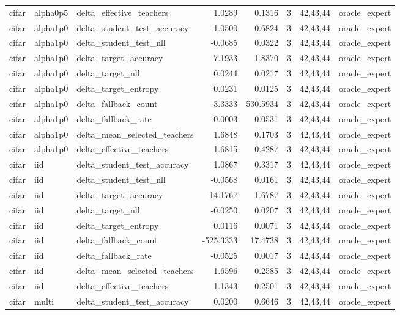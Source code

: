 \begin{tabular}{lllrrrll}
cifar & alpha0p5 & delta\_effective\_teachers & 1.0289 & 0.1316 & 3 & 42,43,44 & oracle\_expert \\
cifar & alpha1p0 & delta\_student\_test\_accuracy & 1.0500 & 0.6824 & 3 & 42,43,44 & oracle\_expert \\
cifar & alpha1p0 & delta\_student\_test\_nll & -0.0685 & 0.0322 & 3 & 42,43,44 & oracle\_expert \\
cifar & alpha1p0 & delta\_target\_accuracy & 7.1933 & 1.8370 & 3 & 42,43,44 & oracle\_expert \\
cifar & alpha1p0 & delta\_target\_nll & 0.0244 & 0.0217 & 3 & 42,43,44 & oracle\_expert \\
cifar & alpha1p0 & delta\_target\_entropy & 0.0231 & 0.0125 & 3 & 42,43,44 & oracle\_expert \\
cifar & alpha1p0 & delta\_fallback\_count & -3.3333 & 530.5934 & 3 & 42,43,44 & oracle\_expert \\
cifar & alpha1p0 & delta\_fallback\_rate & -0.0003 & 0.0531 & 3 & 42,43,44 & oracle\_expert \\
cifar & alpha1p0 & delta\_mean\_selected\_teachers & 1.6848 & 0.1703 & 3 & 42,43,44 & oracle\_expert \\
cifar & alpha1p0 & delta\_effective\_teachers & 1.6815 & 0.4287 & 3 & 42,43,44 & oracle\_expert \\
cifar & iid & delta\_student\_test\_accuracy & 1.0867 & 0.3317 & 3 & 42,43,44 & oracle\_expert \\
cifar & iid & delta\_student\_test\_nll & -0.0568 & 0.0161 & 3 & 42,43,44 & oracle\_expert \\
cifar & iid & delta\_target\_accuracy & 14.1767 & 1.6787 & 3 & 42,43,44 & oracle\_expert \\
cifar & iid & delta\_target\_nll & -0.0250 & 0.0207 & 3 & 42,43,44 & oracle\_expert \\
cifar & iid & delta\_target\_entropy & 0.0116 & 0.0071 & 3 & 42,43,44 & oracle\_expert \\
cifar & iid & delta\_fallback\_count & -525.3333 & 17.4738 & 3 & 42,43,44 & oracle\_expert \\
cifar & iid & delta\_fallback\_rate & -0.0525 & 0.0017 & 3 & 42,43,44 & oracle\_expert \\
cifar & iid & delta\_mean\_selected\_teachers & 1.6596 & 0.2585 & 3 & 42,43,44 & oracle\_expert \\
cifar & iid & delta\_effective\_teachers & 1.1343 & 0.2501 & 3 & 42,43,44 & oracle\_expert \\
cifar & multi & delta\_student\_test\_accuracy & 0.0200 & 0.6646 & 3 & 42,43,44 & oracle\_expert \\

\end{tabular}
